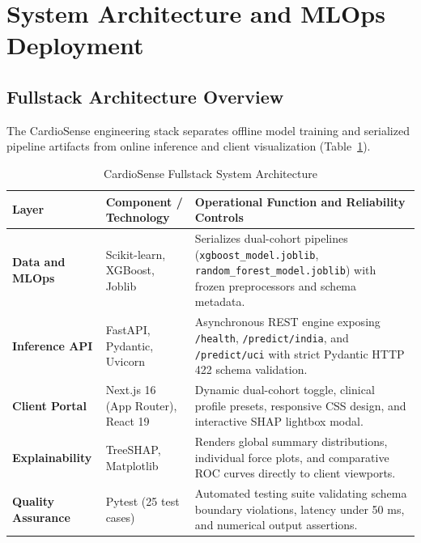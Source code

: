 \documentclass[conference]{IEEEtran}
\begin{document}
\section{System Architecture and MLOps Deployment}

\subsection{Fullstack Architecture Overview}
The CardioSense engineering stack separates offline model training and serialized pipeline artifacts from online inference and client visualization (Table~\ref{tab:architecture_layers}).

\begin{table}[t]
\caption{CardioSense Fullstack System Architecture}
\label{tab:architecture_layers}
\centering
\small
\begin{tabularx}{\textwidth}{l l X}
\toprule
\textbf{Layer} & \textbf{Component / Technology} & \textbf{Operational Function and Reliability Controls} \\
\midrule
\textbf{Data and MLOps} & Scikit-learn, XGBoost, Joblib & Serializes dual-cohort pipelines (\texttt{xgboost\_model.joblib}, \texttt{random\_forest\_model.joblib}) with frozen preprocessors and schema metadata. \\
\textbf{Inference API} & FastAPI, Pydantic, Uvicorn & Asynchronous REST engine exposing \texttt{/health}, \texttt{/predict/india}, and \texttt{/predict/uci} with strict Pydantic HTTP 422 schema validation. \\
\textbf{Client Portal} & Next.js 16 (App Router), React 19 & Dynamic dual-cohort toggle, clinical profile presets, responsive CSS design, and interactive SHAP lightbox modal. \\
\textbf{Explainability} & TreeSHAP, Matplotlib & Renders global summary distributions, individual force plots, and comparative ROC curves directly to client viewports. \\
\textbf{Quality Assurance} & Pytest (25 test cases) & Automated testing suite validating schema boundary violations, latency under 50 ms, and numerical output assertions. \\
\bottomrule
\end{tabularx}
\end{table}
\end{document}
